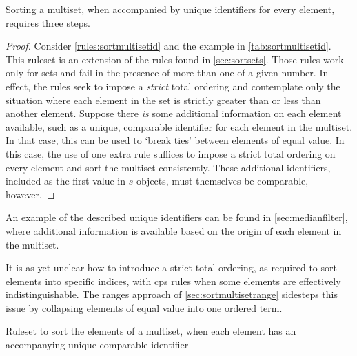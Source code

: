 \begin{proposition}\label{prop:sortmultisetid}
Sorting a multiset, when accompanied by unique identifiers for every element, requires three steps.
\end{proposition}

\begin{proof}
Consider \cref{rules:sortmultisetid} and the example in \cref{tab:sortmultisetid}.  This ruleset is an extension of the rules found in \cref{sec:sortsets}.  Those rules work only for sets and fail in the presence of more than one of a given number.  In effect, the rules seek to impose a \emph{strict} total ordering and contemplate only the situation where each element in the set is strictly greater than or less than another element.  Suppose there \emph{is} some additional information on each element available, such as a unique, comparable identifier for each element in the multiset. In that case, this can be used to `break ties' between elements of equal value.  In this case, the use of one extra rule suffices to impose a strict total ordering on every element and sort the multiset consistently.  These additional identifiers, included as the first value in \(s\) objects, must themselves be comparable, however.
\end{proof}

An example of the described unique identifiers can be found in \cref{sec:medianfilter}, where additional information is available based on the origin of each element in the multiset.

It is as yet unclear how to introduce a strict total ordering, as required to sort elements into specific indices, with \gls{cps} rules when some elements are effectively indistinguishable.  The ranges approach of \cref{sec:sortmultisetrange} sidesteps this issue by collapsing elements of equal value into one ordered term.


\cpresetrulenumber
\begin{cprulesetfloat} \begin{cpruleset}


\end{cpruleset}
\caption{\label{rules:sortmultisetid}Ruleset to sort the elements of a multiset, when each element has an accompanying unique comparable identifier}
\end{cprulesetfloat}

